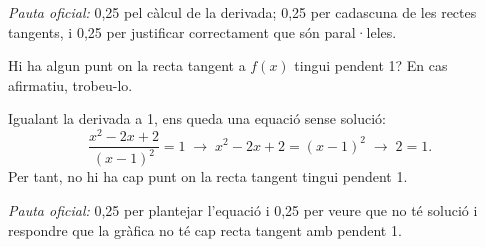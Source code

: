 \begin{apartats}
\begin{solucio}
\textit{Pauta oficial:} 0,25 pel càlcul de la derivada; 0,25 per cadascuna de les rectes tangents, i 0,25 per
justificar correctament que són paral·leles.
\end{solucio}

Hi ha algun punt on la recta tangent a $f(x)$ tingui pendent 1? En cas afirmatiu, trobeu-lo.

\begin{solucio}
Igualant la derivada a 1, ens queda una equació sense solució:
\[
\frac{x^2-2x+2}{(x-1)^2}=1\;\rightarrow\;x^2-2x+2=(x-1)^2\;\rightarrow\;2=1 .
\]
Per tant, no hi ha cap punt on la recta tangent tingui pendent 1.

\textit{Pauta oficial:} 0,25 per plantejar l'equació i 0,25 per veure que no té solució i respondre que la
gràfica no té cap recta tangent amb pendent 1.
\end{solucio}

\end{apartats}
